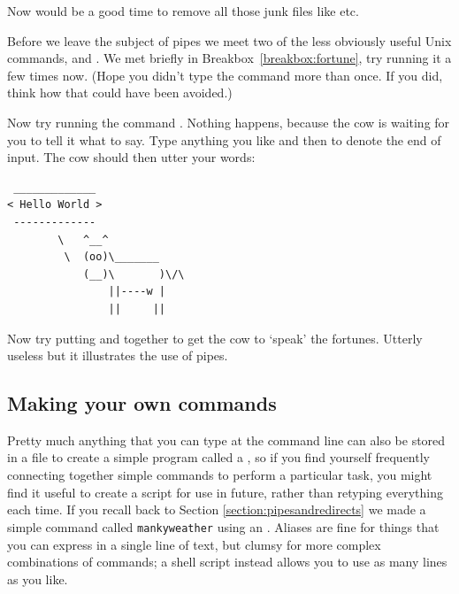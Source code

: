Now would be a good time to remove all those junk files like  etc.

Before we leave the subject of pipes we meet two of the less obviously
useful Unix commands,  and . We met
 briefly in Breakbox~\ref{breakbox:fortune}, try
running it a few times now. (Hope you didn't type the command more
than once. If you did, think how that could have been avoided.)

Now try running the command . Nothing happens, because
the cow is waiting for you to tell it what to say. Type anything you
like and then  to denote the end of input. The cow should then
utter your words:

\begin{verbatim}
 _____________
< Hello World >
 -------------
        \   ^__^
         \  (oo)\_______
            (__)\       )\/\
                ||----w |
                ||     ||
\end{verbatim}


Now try putting  and  together to get
the cow to `speak' the fortunes. Utterly useless but it illustrates
the use of pipes.

\subsection{Making your own commands}
\label{sec:making-your-own}

Pretty much anything that you can type at the command line can also be stored in a file to create a simple program called a , so if you find yourself frequently connecting together simple commands to perform a particular task, you might find it useful to create a script for use in future, rather than retyping everything each time. If you recall back to Section \ref{section:pipesandredirects} we made a simple command called \texttt{mankyweather} using an . Aliases are fine for things that you can express in a single line of text, but clumsy for more complex combinations of commands; a shell script instead allows you to use as many lines as you like.


